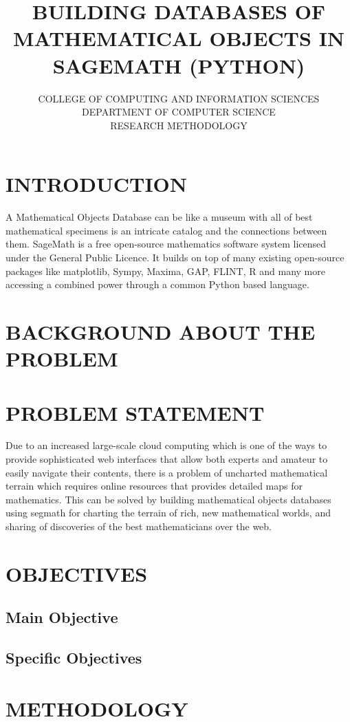 \documentclass[11pt]{report}
\title{\textbf{BUILDING DATABASES OF MATHEMATICAL OBJECTS IN SAGEMATH (PYTHON)}}
\author{COLLEGE OF COMPUTING AND INFORMATION SCIENCES\\DEPARTMENT OF COMPUTER SCIENCE\\RESEARCH METHODOLOGY}
\begin{document}
\maketitle

\section{INTRODUCTION}
A Mathematical Objects Database can be like a museum with all of best mathematical specimens is an intricate catalog and the connections between them. SageMath is a free open-source mathematics software system licensed under the General Public Licence. It builds on top of many existing open-source packages like matplotlib, Sympy, Maxima, GAP, FLINT, R and many more accessing a combined power through a common Python based language.

\section{BACKGROUND ABOUT THE PROBLEM}

\section{PROBLEM STATEMENT}
Due to an increased large-scale cloud computing which is one of the ways to
provide sophisticated web interfaces that allow both experts and amateur to
easily navigate their contents, there is a problem of uncharted mathematical
terrain which requires online resources that provides detailed maps for
mathematics. This can be solved by building mathematical objects databases
using segmath for charting the terrain of rich, new mathematical worlds, and
sharing of discoveries of the best mathematicians over the web.
\section{OBJECTIVES}
\subsection{Main Objective}


\subsection{Specific Objectives}


\section{METHODOLOGY}
\end{document}
